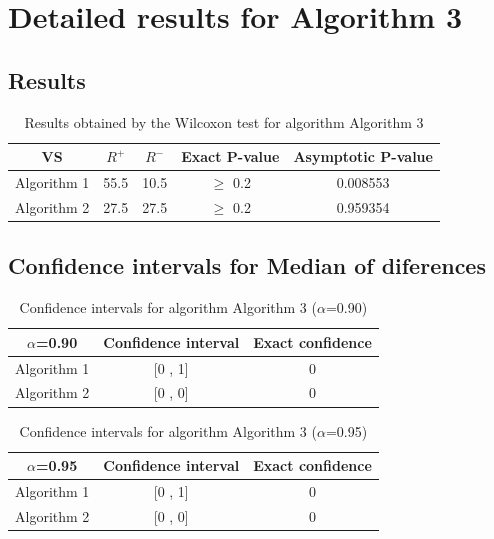 \documentclass[a4paper,10pt]{article}
\begin{document}
 \clearpage 


\section{Detailed results for Algorithm 3}


\subsection{Results}

\begin{table}[!htp]
\centering\small
\begin{tabular}{
|c|c|c|c|c|}
\hline
 VS & $R^{+}$ & $R^{-}$ & Exact P-value & Asymptotic P-value \\ \hline 
Algorithm 1 & 55.5 & 10.5 & $\geq$ 0.2 & 0.008553\\ \hline 
Algorithm 2 & 27.5 & 27.5 & $\geq$ 0.2 & 0.959354\\ \hline 

\end{tabular}
\caption{Results obtained by the Wilcoxon test for algorithm Algorithm 3}
\end{table}

\subsection{Confidence intervals for Median of diferences}

\begin{table}[!htp]
\centering\small
\begin{tabular}{
|c|c|c|}
\hline
 $\alpha$=0.90 & Confidence interval & Exact confidence \\ \hline 
Algorithm 1 & [0 , 1] & 0\\ \hline 
Algorithm 2 & [0 , 0] & 0\\ \hline 

\end{tabular}
\caption{Confidence intervals for algorithm Algorithm 3 ($\alpha$=0.90)}
\end{table}
\begin{table}[!htp]
\centering\small
\begin{tabular}{
|c|c|c|}
\hline
 $\alpha$=0.95 & Confidence interval & Exact confidence \\ \hline 
Algorithm 1 & [0 , 1] & 0\\ \hline 
Algorithm 2 & [0 , 0] & 0\\ \hline 

\end{tabular}
\caption{Confidence intervals for algorithm Algorithm 3 ($\alpha$=0.95)}
\end{table}

 \clearpage 
\end{document}
